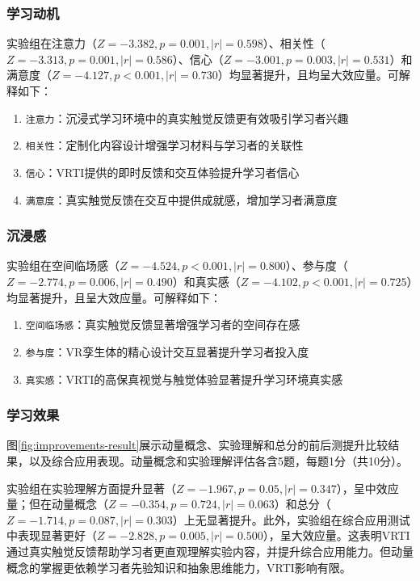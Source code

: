 \documentclass[runningheads]{llncs}
\begin{document}
\subsubsection{学习动机}
实验组在注意力（$Z=-3.382, p=0.001, |r|=0.598$）、相关性（$Z=-3.313, p=0.001, |r|=0.586$）、信心（$Z=-3.001, p=0.003, |r|=0.531$）和满意度（$Z=-4.127, p<0.001, |r|=0.730$）均显著提升，且均呈大效应量。可解释如下：
\begin{enumerate}
  \item {\texttt{注意力}}：沉浸式学习环境中的真实触觉反馈更有效吸引学习者兴趣
  \item {\texttt{相关性}}：定制化内容设计增强学习材料与学习者的关联性
  \item {\texttt{信心}}：VRTI提供的即时反馈和交互体验提升学习者信心
  \item {\texttt{满意度}}：真实触觉反馈在交互中提供成就感，增加学习者满意度
\end{enumerate}

\subsubsection{沉浸感}
实验组在空间临场感（$Z=-4.524, p<0.001, |r|=0.800$）、参与度（$Z=-2.774, p=0.006, |r|=0.490$）和真实感（$Z=-4.102, p<0.001, |r|=0.725$）均显著提升，且呈大效应量。可解释如下：
\begin{enumerate}
  \item {\texttt{空间临场感}}：真实触觉反馈显著增强学习者的空间存在感
  \item {\texttt{参与度}}：VR孪生体的精心设计交互显著提升学习者投入度
  \item {\texttt{真实感}}：VRTI的高保真视觉与触觉体验显著提升学习环境真实感
\end{enumerate}

\subsubsection{学习效果}
图\ref{fig:improvements-result}展示动量概念、实验理解和总分的前后测提升比较结果，以及综合应用表现。动量概念和实验理解评估各含5题，每题1分（共10分）。

实验组在实验理解方面提升显著（$Z=-1.967, p=0.05, |r|=0.347$），呈中效应量；但在动量概念（$Z=-0.354, p=0.724, |r|=0.063$）和总分（$Z=-1.714, p=0.087, |r|=0.303$）上无显著提升。此外，实验组在综合应用测试中表现显著更好（$Z=-2.828, p=0.005, |r|=0.500$），呈大效应量。这表明VRTI通过真实触觉反馈帮助学习者更直观理解实验内容，并提升综合应用能力。但动量概念的掌握更依赖学习者先验知识和抽象思维能力，VRTI影响有限。
\end{document}
